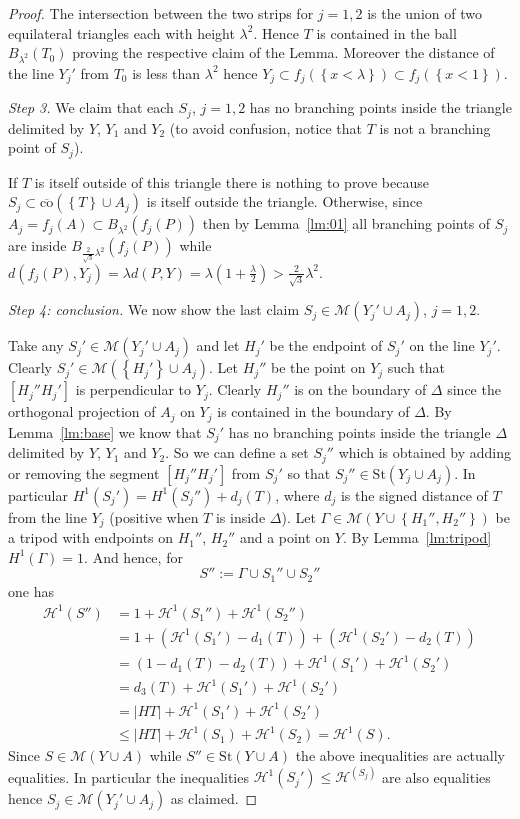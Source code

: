 \documentclass{article}
\renewcommand{\H}{\mathcal H}
\newcommand{\abs}[1]{\left\vert #1 \right\vert}
\newcommand{\enclose}[1]{\left(#1\right)}
\newcommand{\ENCLOSE}[1]{\left\{#1\right\}}
\newcommand{\St}{\mathrm{St}}
\newcommand{\M}{\mathcal{M}}
\renewcommand{\H}{\mathcal{H}}
\newcommand{\co}{\mathrm{co}}
\theoremstyle{definition}
\theoremstyle{remark}
\begin{document}
\begin{proof}
  The intersection between the two strips for $j=1,2$ 
  is the union of two equilateral 
  triangles each with height $\lambda^2$. 
  Hence $T$ is contained in the ball
  $B_{\lambda^2}(T_0)$ proving the respective claim of the Lemma.
  Moreover the distance of the line $Y_j'$ from $T_0$ is less than 
  $\lambda^2$ hence $Y_j\subset f_j(\ENCLOSE{x<\lambda})
  \subset f_j(\ENCLOSE{x<1})$.
  
  \emph{Step 3.}
  We claim that each $S_j$, $j=1,2$ has no branching points inside the triangle 
  delimited by $Y$, $Y_1$ and $Y_2$ 
  (to avoid confusion, notice that $T$ is not a branching point of $S_j$).
 
  If $T$ is itself outside of this triangle there is nothing to prove
  because $S_j\subset \overline{\co}(\ENCLOSE{T}\cup A_j)$ 
  is itself outside the triangle.
  Otherwise, 
  since $A_j=f_j(A)\subset B_{\lambda^2}(f_j(P))$
  then by Lemma~\ref{lm:01} all branching points of $S_j$ 
  are inside $B_{\frac{2}{\sqrt 3}\lambda^2}(f_j(P))$ while 
  $d(f_j(P),Y_j)=\lambda d(P,Y)
  = \lambda \enclose{1+\frac{\lambda} 2 }
  > \frac{2}{\sqrt 3}\lambda^2$.
  
  \emph{Step 4: conclusion.}
  We now show the last claim $S_j \in \M(Y_j'\cup A_j)$, $j=1,2$.

  Take any $S_j'\in \M(Y_j'\cup A_j)$ and let $H_j'$ be the 
  endpoint of $S_j'$ on the line $Y_j'$. 
  Clearly $S_j'\in \M(\ENCLOSE{H_j'}\cup A_j)$.
  Let $H_j''$ be the point on $Y_j$ such that $[H_j'' H_j']$ is perpendicular
  to $Y_j$. 
  Clearly $H_j''$ is on the boundary of $\Delta$ since the orthogonal 
  projection of $A_j$ on $Y_j$ is contained in the boundary of $\Delta$.
  By Lemma~\ref{lm:base} we know that $S_j'$ has no branching points
  inside the triangle $\Delta$ delimited by $Y$, $Y_1$ and $Y_2$.
  So we can define a set $S_j''$ which is obtained by adding or removing 
  the segment $[H_j'' H_j']$ from $S_j'$ so that $S_j''\in \St(Y_j\cup A_j)$.
  In particular $H^1(S_j') = H^1(S_j'') + d_j(T)$,
  where $d_j$ is the signed distance of $T$ from the line $Y_j$ (positive 
  when $T$ is inside $\Delta$).
  Let $\Gamma\in \M(Y\cup\ENCLOSE{H_1'',H_2''})$ 
  be a tripod with endpoints on $H_1''$, $H_2''$ and a 
  point on $Y$. 
  By Lemma~\ref{lm:tripod} $H^1(\Gamma) = 1$.
  And hence, for 
  \[
   S'' := \Gamma \cup S_1'' \cup S_2''  
  \]
  one has 
  \begin{align*}
    \H^1(S'')
    &= 1 + \H^1(S_1'') + \H^1(S_2'') \\
    &= 1 + (\H^1(S_1') - d_1(T)) + (\H^1(S_2') - d_2(T)) \\
    &= (1-d_1(T) - d_2(T)) + \H^1(S_1') + \H^1(S_2') \\
    &= d_3(T) + \H^1(S_1') + \H^1(S_2') \\
    &= \abs{HT} + \H^1(S_1') + \H^1(S_2') \\
    &\le \abs{HT} + \H^1(S_1) + \H^1(S_2)
    = \H^1(S).
  \end{align*}
  Since $S\in \M(Y\cup A)$ while $S''\in \St(Y\cup A)$ the above 
  inequalities are actually equalities.
  In particular the inequalities $\H^1(S_j') \le \H^(S_j)$ are 
  also equalities hence $S_j\in \M(Y_j'\cup A_j)$ as claimed.
\end{proof}
\end{document}
